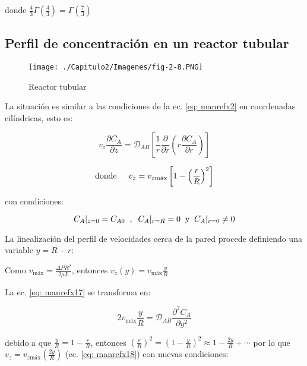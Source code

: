 donde $\frac{4}{3} \Gamma (\frac{4}{3}) = \Gamma (\frac{7}{3})$

\subsection{Perfil de concentración en un reactor tubular}

\begin{figure}[H]
	\centering
	\texttt{[image: ./Capitulo2/Imagenes/fig-2-8.PNG]}
	\caption{Reactor tubular}
\end{figure}

La situación es similar a las condiciones de la ec. \eqref{eq: manrefx2} en coordenadas cilíndricas, esto es: 

\begin{equation} \label{eq: manrefx17}
v_z \frac{\partial C_A}{\partial z} = \mathscr{D}_{AB} \left[ \frac{1}{r} \frac{\partial}{\partial r} \left( r \frac{\partial C_A}{\partial r} \right)  \right]
\end{equation}

\begin{equation} \label{eq: manrefx18}
\text{donde} \hspace{0.5cm} v_z = v_{z\text{máx}} \left[ 1 - \left( \frac{r}{R} \right)^2 \right]
\end{equation}

con condiciones:

\begin{equation}
C_A|_{z=0} = C_{A0} \hspace{0.2cm} , \hspace{0.2cm} C_A|_{r=R} = 0 \hspace{0.2cm} \text{y} \hspace{0.2cm} C_A|_{r=0} \neq 0
\end{equation}

La linealización del perfil de velocidades cerca de la pared procede definiendo una variable $y = R-r$:

Como $v_{\text{máx}} = \frac{\Delta P R^2}{2 \mu L}$, entonces $v_z (y) = v_{\text{máx}} \frac{y}{R} $

La ec. \eqref{eq: manrefx17} se transforma en:

\begin{equation}
	2 v_{\text{máx}} \frac{y}{R} = \mathscr{D}_{AB} \frac{\partial^2 C_A}{\partial y^2}
\end{equation}

debido a que $\frac{y}{R} = 1 - \frac{r}{R}$, entonces $\left( \frac{r}{R} \right)^2 = \left( 1 - \frac{y}{R} \right)^2 \approx 1 - \frac{2 y}{R} + \cdots$ por lo que $v_z = v_{z \text{máx}} (\frac{2y}{R})$ (ec. \eqref{eq: manrefx18}) con nuevas condiciones:

